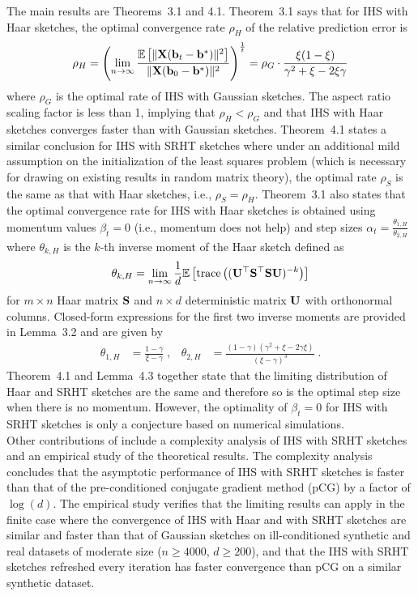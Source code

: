 The main results are Theorems~3.1 and 4.1. Theorem~3.1 says that for IHS with Haar sketches, the optimal convergence rate $\rho_H$ of the relative prediction error is
\[
\rho_H  = \left(\lim_{n\rightarrow\infty}\frac{\mathbb{E}\left[\|\mathbf{X}(\mathbf{b}_t-\mathbf{b}^*)\|^2\right]}{\|\mathbf{X}(\mathbf{b}_0-\mathbf{b}^*)\|^2}\right)^\frac{1}{t} = \rho_G\cdot\frac{\xi(1-\xi)}{\gamma^2+\xi-2\xi\gamma}
\]
where $\rho_G$ is the optimal rate of IHS with Gaussian sketches. The aspect ratio scaling factor is less than 1, implying that $\rho_H<\rho_G$ and that IHS with Haar sketches converges faster than with Gaussian sketches.  Theorem~4.1 states a similar conclusion for IHS with SRHT sketches where under an additional mild assumption on the initialization of the least squares problem (which is necessary for drawing on existing results in random matrix theory), the optimal rate $\rho_S$ is the same as that with Haar sketches, i.e., $\rho_S=\rho_H$. Theorem~3.1 also states that the optimal convergence rate for IHS with Haar sketches is obtained using momentum values $\beta_t=0$ (i.e., momentum does not help) and step sizes $\alpha_t = \frac{\theta_{1,H}}{\theta_{2,H}}$ where $\theta_{k,H}$ is the $k$-th inverse moment of the Haar sketch defined as
\[
\theta_{k,H} = \lim_{n\rightarrow\infty}\frac{1}{d}\mathbb{E}\left[\mathrm{trace}\left((\mathbf{U}^\top\mathbf{S}^\top\mathbf{S}\mathbf{U})^{-k}\right)\right]
\]
for $m\times n$ Haar matrix $\mathbf{S}$ and $n\times d$ deterministic matrix $\mathbf{U}$ with orthonormal columns. Closed-form expressions for the first two inverse moments are provided in Lemma~3.2 and are given by
\begin{align*}
\theta_{1,H} &= \frac{1-\gamma}{\xi-\gamma} \;, & \theta_{2,H} &= \frac{(1-\gamma)(\gamma^2+\xi-2\gamma\xi)}{(\xi-\gamma)^3} \;.
\end{align*}
Theorem~4.1 and Lemma~4.3 together state that the limiting distribution of Haar and SRHT sketches are the same and therefore so is the optimal step size when there is no momentum. However, the optimality of $\beta_t=0$ for IHS with SRHT sketches is only a conjecture based on numerical simulations.
\\

Other contributions of \citet{Lacotte:2020} include a complexity analysis of IHS with SRHT sketches and an empirical study of the theoretical results. The complexity analysis concludes that the asymptotic performance of IHS with SRHT sketches is faster than that of the pre-conditioned conjugate gradient method (pCG) \citep{Rokhlin:2008} by a factor of $\log(d)$. The empirical study verifies that the limiting results can apply in the finite case where the convergence of IHS with Haar and with SRHT sketches are similar and faster than that of Gaussian sketches on ill-conditioned synthetic and real datasets of moderate size ($n\geq 4000$, $d\geq 200$), and that the IHS with SRHT sketches refreshed every iteration has faster convergence than pCG on a similar synthetic dataset.


